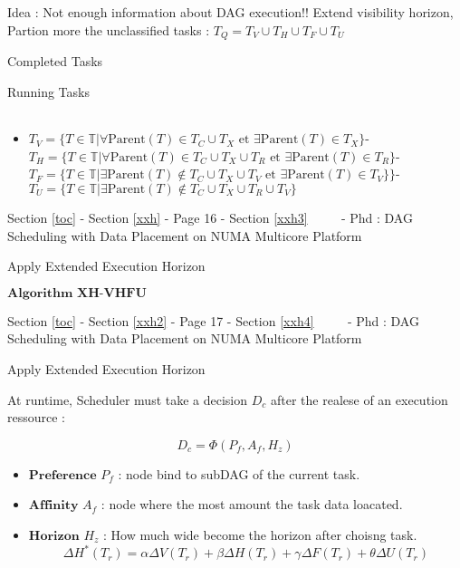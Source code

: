 \documentclass[11pt]{article}
\providecommand{\tightlist}{%
      \setlength{\itemsep}{0pt}\setlength{\parskip}{0pt}}
\begin{document}
\textbar{} \textbar{}

Idea : Not enough information about DAG execution!! Extend visibility
horizon, Partion more the unclassified tasks :
\(T_Q = T_V \cup T_H \cup T_F \cup T_U\)

\textbar{}

Completed Tasks

\textbar{}

Running Tasks

\begin{longtable}[]{@{}ll@{}}
\toprule
\bottomrule
\end{longtable}

\textbar{}

\begin{itemize}
\tightlist
\item
  \(T_V = \{ T \in \mathbb{T} | \forall \text{Parent}(T) \in T_C \cup T_X \text{ et } \exists \text{Parent}(T) \in T_X \}\)-
  \(T_H = \{ T \in \mathbb{T} | \forall \text{Parent}(T) \in T_C \cup T_X \cup T_R \text{ et } \exists \text{Parent}(T) \in T_R \}\)-
  \(T_F = \{ T \in \mathbb{T} | \exists \text{Parent}(T) \notin T_C \cup T_X \cup T_V \text{ et } \exists \text{Parent}(T) \in T_V \}\}\)-
  \(T_U = \{ T \in \mathbb{T} | \exists \text{Parent}(T) \notin T_C \cup T_X \cup T_R \cup T_V \}\)

  \textbar{}\textbar{} 
\end{itemize}

     {Section \ref{toc} - Section \ref{xxh} - Page 16 - Section \ref{xxh3}
~~~~ - Phd : DAG Scheduling with Data Placement on NUMA Multicore
Platform}

Apply Extended Execution Horizon

\(\textbf{Algorithm XH-VHFU}\)

 

     {Section \ref{toc} - Section \ref{xxh2} - Page 17 - Section \ref{xxh4}
~~~~ - Phd : DAG Scheduling with Data Placement on NUMA Multicore
Platform}

Apply Extended Execution Horizon

At runtime, Scheduler must take a decision \(D_c\) after the realese of
an execution ressource :

\[D_c = \Phi(P_f , A_f, H_z)\]

\begin{itemize}
\tightlist
\item
  \(\textbf{Preference}\) \(P_f\) : node bind to subDAG of the current
  task.
\item
  \(\textbf{Affinity}\) \(A_f\) : node where the most amount the task
  data loacated.
\item
  \(\textbf{Horizon}\) \(H_z\) : How much wide become the horizon after
  choisng task. \[
  \Delta H^*(T_r) = \alpha \Delta V(T_r) + \beta \Delta H(T_r) + \gamma \Delta F(T_r)  + \theta \Delta U(T_r) 
  \]
\end{itemize}
\end{document}
